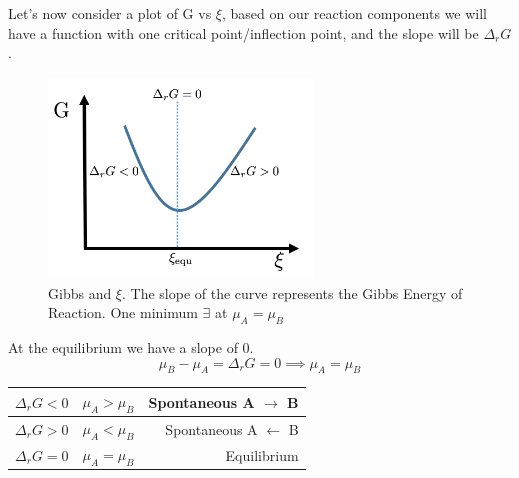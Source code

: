 \documentclass{article}
\begin{document}
Let's now consider a plot of G vs $\xi$, based on our reaction components we will have a function with one critical point/inflection point, and the slope will be $\Delta_rG$.
\begin{figure}[! h]
    \centering
    \includegraphics[width=7cm]{rxnG.png}
    \caption{Gibbs and $\xi$. The slope of the curve represents the Gibbs Energy of Reaction. One minimum $\exists$ at $\mu_A = \mu_B$ }
    \label{fig:rxnG}
\end{figure}
At the equilibrium we have a slope of 0. 
\begin{equation}
\mu_B - \mu_A = \Delta_rG = 0 \implies \mu_A = \mu_B
\end{equation}
\begin{center}
  \begin{tabular}{ | l | c | r |}
    \hline
    $\Delta_rG < 0$ & $\mu_A > \mu_B$ & Spontaneous A $\rightarrow$ B \\ \hline
     $\Delta_rG > 0$ & $\mu_A < \mu_B$ & Spontaneous A $\leftarrow$ B \\ \hline
     $\Delta_rG = 0$ & $\mu_A = \mu_B$ & Equilibrium \\
    \hline
  \end{tabular}
\end{center}
\end{document}
